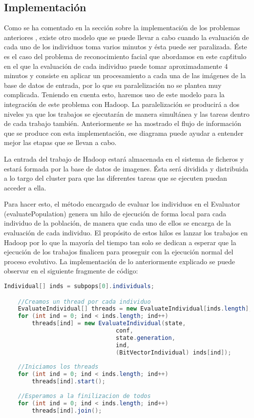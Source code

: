 \subsection{Implementaci\'on} \label{problema-facerecognition-implementacion}

Como se ha comentado en la sección sobre la implementación de los problemas anteriores , existe otro modelo que se puede llevar a cabo cuando la evaluación de cada uno de los individuos toma varios minutos y \'esta puede ser paralizada. \'Este es el caso del problema de reconocimiento facial que abordamos en este cap\'titulo en el que la evaluación de cada individuo puede tomar aproximadamente 4 minutos y consiste en aplicar un procesamiento a cada una de las imágenes de la base de datos de entrada, por lo que su paralelizaci\'on no se plantea muy complicada. Teniendo en cuenta esto, haremos uso de este modelo para la integraci\'on de este problema con Hadoop. La paralelizaci\'on se producirá a dos niveles ya que los trabajos se ejecutar\'an de manera simultánea y las tareas dentro de cada trabajo también. Anteriormente  se ha mostrado el flujo de información que se produce con esta implementación, ese diagrama puede ayudar a entender mejor las etapas que se llevan a cabo.

La entrada del trabajo de Hadoop estar\'a almacenada en el sistema de ficheros y estar\'a formada por la base de datos de imagenes. \'Esta ser\'a dividida y distribuida a lo targo del cluster para que las diferentes tareas que se ejecuten puedan acceder a ella.

Para hacer esto, el método encargado de evaluar los individuos en el Evaluator (evaluatePopulation) genera un hilo de ejecución de forma local para cada individuo de la poblaci\'on, de manera que cada uno de ellos se encarga de la evaluación de cada individuo. El propósito de estos hilos es lanzar los trabajos en Hadoop por lo que la mayoría del tiempo tan solo se dedican a esperar que la ejecución de los trabajos finalicen para proseguir con la ejecución normal del proceso evolutivo. La implementación de lo anteriormente explicado se puede observar en el siguiente fragmente de código:

\begin{lstlisting}[language=Java]
	Individual[] inds = subpops[0].individuals;

	//Creamos un thread por cada individuo
	EvaluateIndividual[] threads = new EvaluateIndividual[inds.length];
	for (int ind = 0; ind < inds.length; ind++)
		threads[ind] = new EvaluateIndividual(state, 
								conf, 
								state.generation, 
								ind, 
								(BitVectorIndividual) inds[ind]);
			
	//Iniciamos los threads
	for (int ind = 0; ind < inds.length; ind++)
		threads[ind].start();
			
	//Esperamos a la finilizacion de todos
	for (int ind = 0; ind < inds.length; ind++)
		threads[ind].join();
\end{lstlisting}

